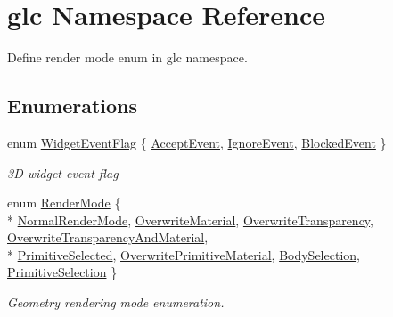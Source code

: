 \hypertarget{namespaceglc}{\section{glc Namespace Reference}
\label{namespaceglc}
}


Define render mode enum in glc namespace.  


\subsection*{Enumerations}
\begin{DoxyCompactItemize}
\item 
enum \hyperlink{namespaceglc_a7a4a1e3955352aeb2d018746fbe626d5}{Widget\-Event\-Flag} \{ \hyperlink{namespaceglc_a7a4a1e3955352aeb2d018746fbe626d5a21af3cc408c350829ea24dcb9d95a88f}{Accept\-Event}, 
\hyperlink{namespaceglc_a7a4a1e3955352aeb2d018746fbe626d5ab0a995b1546bbbdf0574c131233817f3}{Ignore\-Event}, 
\hyperlink{namespaceglc_a7a4a1e3955352aeb2d018746fbe626d5a6b625462152c58db821e09ee05688dd9}{Blocked\-Event}
 \}
\begin{DoxyCompactList}\small\item\em 3\-D widget event flag \end{DoxyCompactList}\item 
enum \hyperlink{namespaceglc_a07d65b257fe4f2b50ce733149d41c87c}{Render\-Mode} \{ \\*
\hyperlink{namespaceglc_a07d65b257fe4f2b50ce733149d41c87ca199e3a3204198a598c33eeb0331667f7}{Normal\-Render\-Mode}, 
\hyperlink{namespaceglc_a07d65b257fe4f2b50ce733149d41c87ca7fef71c62e4a614c275ec00ac837a517}{Overwrite\-Material}, 
\hyperlink{namespaceglc_a07d65b257fe4f2b50ce733149d41c87ca3043395140da0af55f5427fe3231b9f7}{Overwrite\-Transparency}, 
\hyperlink{namespaceglc_a07d65b257fe4f2b50ce733149d41c87cafe0a39c0b7580929a8c825b2e922e8bf}{Overwrite\-Transparency\-And\-Material}, 
\\*
\hyperlink{namespaceglc_a07d65b257fe4f2b50ce733149d41c87caaeafee5cad5e469f3e700623681c7bee}{Primitive\-Selected}, 
\hyperlink{namespaceglc_a07d65b257fe4f2b50ce733149d41c87ca4d4d5dcc69b4352a4dc132012fba2036}{Overwrite\-Primitive\-Material}, 
\hyperlink{namespaceglc_a07d65b257fe4f2b50ce733149d41c87ca105d612801a59365490f389f6d04f913}{Body\-Selection}, 
\hyperlink{namespaceglc_a07d65b257fe4f2b50ce733149d41c87cad3f48f28a45d0a22e5b0c841688ecfa0}{Primitive\-Selection}
 \}
\begin{DoxyCompactList}\small\item\em Geometry rendering mode enumeration. \end{DoxyCompactList}\item 

\end{DoxyCompactItemize}
